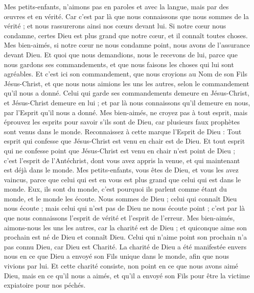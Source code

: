 \begin{multicols}{2}
Mes petits-enfants, n'aimons pas en paroles et avec la langue, mais par des œuvres et en vérité.
Car c'est par là que nous connaissons que nous sommes de la vérité ; et nous rassurerons ainsi nos cœurs devant lui.
Si notre cœur nous condamne, certes Dieu est plus grand que notre cœur, et il connaît toutes choses.
Mes bien-aimés, si notre cœur ne nous condamne point, nous avons de l’assurance devant Dieu.
Et quoi que nous demandions, nous le recevons de lui, parce que nous gardons ses commandements, et que nous faisons les choses qui lui sont agréables.
Et c'est ici son commandement, que nous croyions au Nom de son Fils Jésus-Christ, et que nous nous aimions les uns les autres, selon le commandement qu’il nous a donné.
Celui qui garde ses commandements demeure en Jésus-Christ, et Jésus-Christ demeure en lui ; et par là nous connaissons qu'il demeure en nous, par l'Esprit qu'il nous a donné.
\VerseOne{}Mes bien-aimés, ne croyez pas à tout esprit, mais éprouvez les esprits pour savoir s'ils sont de Dieu, car plusieurs faux prophètes sont venus dans le monde.
Reconnaissez à cette marque l'Esprit de Dieu : Tout esprit qui confesse que Jésus-Christ est venu en chair est de Dieu.
Et tout esprit qui ne confesse point que Jésus-Christ est venu en chair n'est point de Dieu ; c’est l'esprit de l'Antéchrist, dont vous avez appris la venue, et qui maintenant est déjà dans le monde.
Mes petits-enfants, vous êtes de Dieu, et vous les avez vaincus, parce que celui qui est en vous est plus grand que celui qui est dans le monde.
Eux, ils sont du monde, c'est pourquoi ils parlent comme étant du monde, et le monde les écoute.
Nous sommes de Dieu ; celui qui connaît Dieu nous écoute ; mais celui qui n'est pas de Dieu ne nous écoute point ; c’est par là que nous connaissons l'esprit de vérité et l'esprit de l’erreur.
Mes bien-aimés, aimons-nous les uns les autres, car la charité est de Dieu ; et quiconque aime son prochain est né de Dieu et connaît Dieu.
Celui qui n'aime point son prochain n'a pas connu Dieu, car Dieu est Charité{}.
La charité de Dieu a été manifestée envers nous en ce que Dieu a envoyé son Fils unique dans le monde, afin que nous vivions par lui.
Et cette charité consiste, non point en ce que nous avons aimé Dieu, mais en ce qu'il nous a aimés, et qu'il a envoyé son Fils pour être la victime expiatoire pour nos péchés.

\end{multicols}
